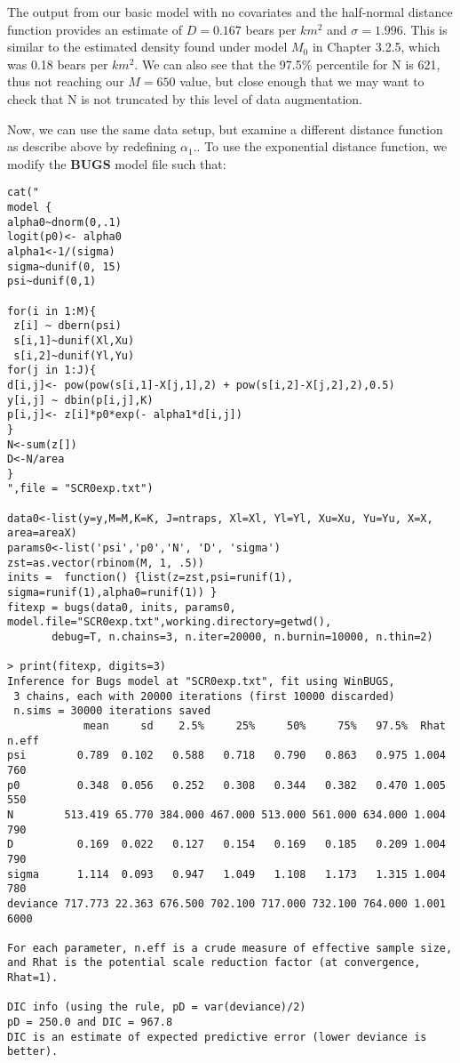The output from our basic model with no covariates and the half-normal distance function provides an estimate of $D = 0.167$ bears per $km^2$ and $\sigma = 1.996$.  This is similar to the estimated density found under model $M_0$ in Chapter 3.2.5, which was 0.18 bears per $km^2$.  We can also see that the 97.5\% percentile for N is 621, thus not reaching our $M=650$ value, but close enough that we may want to check that N is not truncated by this level of data augmentation.

Now, we can use the same data setup, but examine a different distance function as describe above by redefining $\alpha_1$.. To use the exponential distance function, we modify the {\bf BUGS} model file such that:
{\small
\begin{verbatim}
cat("
model {
alpha0~dnorm(0,.1)
logit(p0)<- alpha0
alpha1<-1/(sigma)
sigma~dunif(0, 15)
psi~dunif(0,1)

for(i in 1:M){
 z[i] ~ dbern(psi)
 s[i,1]~dunif(Xl,Xu)
 s[i,2]~dunif(Yl,Yu)
for(j in 1:J){
d[i,j]<- pow(pow(s[i,1]-X[j,1],2) + pow(s[i,2]-X[j,2],2),0.5)
y[i,j] ~ dbin(p[i,j],K)
p[i,j]<- z[i]*p0*exp(- alpha1*d[i,j])
}
N<-sum(z[])
D<-N/area
}
",file = "SCR0exp.txt")

data0<-list(y=y,M=M,K=K, J=ntraps, Xl=Xl, Yl=Yl, Xu=Xu, Yu=Yu, X=X, area=areaX)
params0<-list('psi','p0','N', 'D', 'sigma')
zst=as.vector(rbinom(M, 1, .5))
inits =  function() {list(z=zst,psi=runif(1), sigma=runif(1),alpha0=runif(1)) }
fitexp = bugs(data0, inits, params0, model.file="SCR0exp.txt",working.directory=getwd(),    
       debug=T, n.chains=3, n.iter=20000, n.burnin=10000, n.thin=2)

> print(fitexp, digits=3)
Inference for Bugs model at "SCR0exp.txt", fit using WinBUGS,
 3 chains, each with 20000 iterations (first 10000 discarded)
 n.sims = 30000 iterations saved
            mean     sd    2.5%     25%     50%     75%   97.5%  Rhat n.eff
psi        0.789  0.102   0.588   0.718   0.790   0.863   0.975 1.004   760
p0         0.348  0.056   0.252   0.308   0.344   0.382   0.470 1.005   550
N        513.419 65.770 384.000 467.000 513.000 561.000 634.000 1.004   790
D          0.169  0.022   0.127   0.154   0.169   0.185   0.209 1.004   790
sigma      1.114  0.093   0.947   1.049   1.108   1.173   1.315 1.004   780
deviance 717.773 22.363 676.500 702.100 717.000 732.100 764.000 1.001  6000

For each parameter, n.eff is a crude measure of effective sample size,
and Rhat is the potential scale reduction factor (at convergence, Rhat=1).

DIC info (using the rule, pD = var(deviance)/2)
pD = 250.0 and DIC = 967.8
DIC is an estimate of expected predictive error (lower deviance is
better).
\end{verbatim}
}

